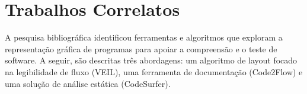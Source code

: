 



\section{Trabalhos Correlatos}

A pesquisa bibliográfica identificou ferramentas e algoritmos que exploram a representação gráfica de programas para apoiar a compreensão e o teste de software. A seguir, são descritas três abordagens: um algoritmo de layout focado na legibilidade de fluxo (VEIL), uma ferramenta de documentação (Code2Flow) e uma solução de análise estática (CodeSurfer).

